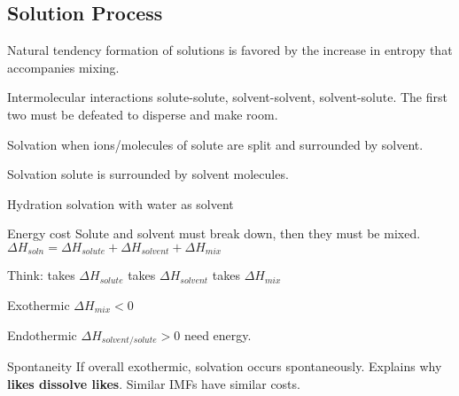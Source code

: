 \begin{mdframed}\subsection{Solution Process}
\begin{multicols}{2}\begin{compactdesc}
    \item[Natural tendency] formation of solutions is favored by the increase in
        entropy that accompanies mixing.
    \item[Intermolecular interactions] solute-solute, solvent-solvent,
        solvent-solute. The first two must be defeated to disperse and make room.
    \item[Solvation] when ions/molecules of solute are split and surrounded by
        solvent.
    \item[Solvation] solute is surrounded by solvent molecules.
    \item[Hydration] solvation with water as solvent
    \item[Energy cost] Solute and solvent must break down, then they must be
        mixed.
        $ \Delta H_{soln}
        = \Delta H_{solute} + \Delta H_{solvent} + \Delta H_{mix}$

        Think:
             takes $\Delta H_{solute}$
             takes $\Delta H_{solvent}$
             takes $\Delta H_{mix}$
    \item[Exothermic] $\Delta H_{mix} < 0$
    \item[Endothermic] $\Delta H_{solvent/solute} > 0$ need energy.
    \item[Spontaneity] If overall exothermic, solvation occurs spontaneously.
        Explains why \textbf{likes dissolve likes}. Similar IMFs have similar
        costs.
\end{compactdesc}\end{multicols}\end{mdframed}


